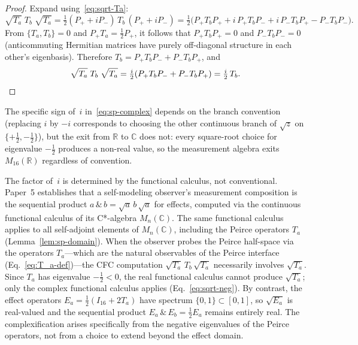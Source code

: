 \begin{proof}
Expand using~\eqref{eq:sqrt-Ta}:
\begin{equation}\label{eq:sp-expand}
  \sqrt{T_a}\; T_b\; \sqrt{T_a}
  = \tfrac{1}{2}(P_+ + iP_-)\,T_b\,(P_+ + iP_-)
  = \tfrac{1}{2}\bigl(P_+ T_b P_+ + i\,P_+ T_b P_-
    + i\,P_- T_b P_+ - P_- T_b P_-\bigr).
\end{equation}
From $\{T_a, T_b\} = 0$ and $P_+ T_a = \tfrac{1}{2}P_+$, it follows
that $P_+ T_b P_+ = 0$ and $P_- T_b P_- = 0$ (anticommuting Hermitian
matrices have purely off-diagonal structure in each other's eigenbasis).
Therefore $T_b = P_+ T_b P_- + P_- T_b P_+$, and
\begin{equation}
  \sqrt{T_a}\; T_b\; \sqrt{T_a}
  = \tfrac{i}{2}(P_+ T_b P_- + P_- T_b P_+) = \tfrac{i}{2}\,T_b.
  \qedhere
\end{equation}
\end{proof}

\noindent
The specific sign of~$i$ in~\eqref{eq:sp-complex} depends on the
branch convention (replacing $i$ by $-i$ corresponds to choosing the
other continuous branch of $\sqrt{z}$ on
$\{+\tfrac{1}{2},-\tfrac{1}{2}\}$), but the exit from $\mathbb{R}$
to $\mathbb{C}$ does not: every square-root choice for eigenvalue
$-\tfrac{1}{2}$ produces a non-real value, so the measurement
algebra exits $M_{16}(\mathbb{R})$ regardless of convention.

The factor of~$i$ is determined by the functional calculus, not
conventional.  Paper~5 establishes
that a self-modeling observer's measurement composition is the
sequential product $a\,\&\,b = \sqrt{a}\,b\,\sqrt{a}$ for effects,
computed via the continuous functional calculus of its C*-algebra
$M_n(\mathbb{C})$.  The same functional calculus applies to all
self-adjoint elements of $M_n(\mathbb{C})$, including the Peirce
operators $T_a$ (Lemma~\ref{lem:sp-domain}).  When the observer
probes the Peirce half-space
via the operators $T_a$---which are the natural observables of
the Peirce interface (Eq.~\eqref{eq:T_a-def})---the CFC computation
$\sqrt{T_a}\,T_b\,\sqrt{T_a}$ necessarily involves $\sqrt{T_a}$.  Since $T_a$ has
eigenvalue $-\tfrac{1}{2} < 0$, the real functional calculus
cannot produce $\sqrt{T_a}$; only the complex functional calculus
applies (Eq.~\eqref{eq:sqrt-neg}).  By contrast, the
effect operators $E_a = \tfrac{1}{2}(I_{16} + 2T_a)$ have spectrum
$\{0, 1\} \subset [0, 1]$, so $\sqrt{E_a}$ is real-valued and the
sequential product $E_a\,\&\,E_b = \tfrac{1}{2}E_a$ remains entirely
real.  The complexification arises specifically from the negative
eigenvalues of the Peirce operators, not from a choice to extend
beyond the effect domain.

